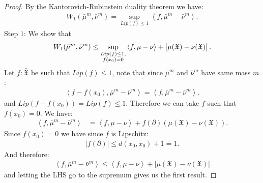 \documentclass[11pt,a4paper]{article}
\newcommand{\XF}{\mathfrak{X}}
\newcommand{\brac}[1]{\left\langle#1\right\rangle}
\begin{document}
\begin{proof}
     By the Kantorovich-Rubinstein duality theorem we have:
    \begin{align*}
        W_1(\bar{\mu}^m,\bar{\nu}^m) = \sup\limits_{Lip(f) \leq 1} \brac{f,\bar{\mu}^m - \bar{\nu}^m} .
    \end{align*}
    Step $1$: We show that
    \begin{align*}
        W_1(\bar{\mu}^m,\bar{\nu}^m) \leq  \sup\limits_{\substack{Lip(f) \leq 1,\\ f(x_0) = 0}} \brac{f,\mu - \nu} + \left|\vphantom{A^2}\mu(\XF) - \nu(\XF) \right|.
    \end{align*}
    Let $f: \bar{\XF}$ be such that $Lip(f)\leq 1$, note that since $\bar{\mu}^m$ and $\bar{\nu}^m$ have same mass $m$:
    \begin{align*}
         \brac{f -f(x_0),\bar{\mu}^m - \bar{\nu}^m} =  \brac{f,\bar{\mu}^m - \bar{\nu}^m}.
    \end{align*}
    and $Lip(f-f(x_0)) = Lip(f) \leq 1$. Therefore we can take $f$ such that $f(x_0) = 0$. We have:
    \begin{align*}
       \brac{f,\bar{\mu}^m - \bar{\nu}^m} 
       &= \brac{f,\mu - \nu} + f(\partial)\left( \mu(\XF) - \nu(\XF)\right).
    \end{align*}
    Since $f(x_0) = 0$ we have since $f$ is Lipschitz:
    \begin{align*}
        \left| f(\partial) \right| \leq d(x_0,x_0) + 1 = 1.
    \end{align*}
    And therefore:
    \begin{align*}
        \brac{f,\bar{\mu}^m - \bar{\nu}^m}  \leq \brac{f,\mu - \nu} + \left| \mu(\XF) - \nu(\XF)\right|
    \end{align*}
    and letting the LHS go to the supremum gives us the first result.


\end{proof}
\end{document}
